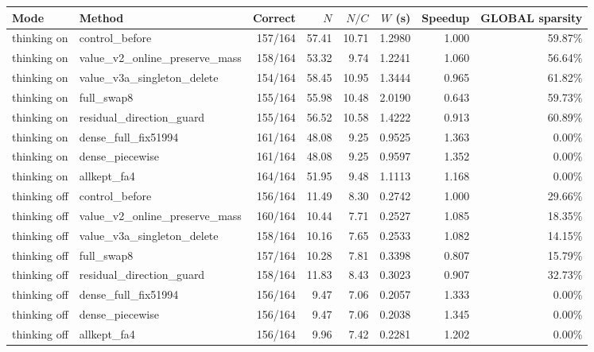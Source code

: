 \begin{tabular}{llrrrrrr}
\toprule
Mode & Method & Correct & $N$ & $N/C$ & $W$ (s) & Speedup & GLOBAL sparsity \\
\midrule
thinking on & control\_before & 157/164 & 57.41 & 10.71 & 1.2980 & 1.000 & 59.87\% \\
thinking on & value\_v2\_online\_preserve\_mass & 158/164 & 53.32 & 9.74 & 1.2241 & 1.060 & 56.64\% \\
thinking on & value\_v3a\_singleton\_delete & 154/164 & 58.45 & 10.95 & 1.3444 & 0.965 & 61.82\% \\
thinking on & full\_swap8 & 155/164 & 55.98 & 10.48 & 2.0190 & 0.643 & 59.73\% \\
thinking on & residual\_direction\_guard & 155/164 & 56.52 & 10.58 & 1.4222 & 0.913 & 60.89\% \\
thinking on & dense\_full\_fix51994 & 161/164 & 48.08 & 9.25 & 0.9525 & 1.363 & 0.00\% \\
thinking on & dense\_piecewise & 161/164 & 48.08 & 9.25 & 0.9597 & 1.352 & 0.00\% \\
thinking on & allkept\_fa4 & 164/164 & 51.95 & 9.48 & 1.1113 & 1.168 & 0.00\% \\
thinking off & control\_before & 156/164 & 11.49 & 8.30 & 0.2742 & 1.000 & 29.66\% \\
thinking off & value\_v2\_online\_preserve\_mass & 160/164 & 10.44 & 7.71 & 0.2527 & 1.085 & 18.35\% \\
thinking off & value\_v3a\_singleton\_delete & 158/164 & 10.16 & 7.65 & 0.2533 & 1.082 & 14.15\% \\
thinking off & full\_swap8 & 157/164 & 10.28 & 7.81 & 0.3398 & 0.807 & 15.79\% \\
thinking off & residual\_direction\_guard & 158/164 & 11.83 & 8.43 & 0.3023 & 0.907 & 32.73\% \\
thinking off & dense\_full\_fix51994 & 156/164 & 9.47 & 7.06 & 0.2057 & 1.333 & 0.00\% \\
thinking off & dense\_piecewise & 156/164 & 9.47 & 7.06 & 0.2038 & 1.345 & 0.00\% \\
thinking off & allkept\_fa4 & 156/164 & 9.96 & 7.42 & 0.2281 & 1.202 & 0.00\% \\
\bottomrule
\end{tabular}
